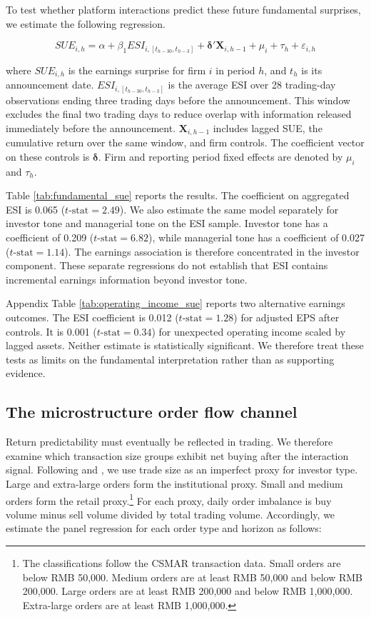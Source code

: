 \documentclass[12pt]{article}
\begin{document}
To test whether platform interactions predict these future fundamental surprises, we estimate the following regression.

\begin{equation}
    SUE_{i, h} = \alpha + \beta_1 ESI_{i,[t_{h-30}, t_{h-3}]} + \boldsymbol{\delta}'\mathbf{X}_{i,h-1} + \mu_i + \tau_h + \varepsilon_{i,h}
\end{equation}

\noindent where $SUE_{i,h}$ is the earnings surprise for firm $i$ in period $h$, and $t_h$ is its announcement date. $ESI_{i,[t_{h-30},t_{h-3}]}$ is the average ESI over 28 trading-day observations ending three trading days before the announcement. This window excludes the final two trading days to reduce overlap with information released immediately before the announcement. $\mathbf{X}_{i,h-1}$ includes lagged SUE, the cumulative return over the same window, and firm controls. The coefficient vector on these controls is $\boldsymbol{\delta}$. Firm and reporting period fixed effects are denoted by $\mu_i$ and $\tau_h$.

Table \ref{tab:fundamental_sue} reports the results. The coefficient on aggregated ESI is 0.065 ($t\text{-stat}=2.49$). We also estimate the same model separately for investor tone and managerial tone on the ESI sample. Investor tone has a coefficient of 0.209 ($t\text{-stat}=6.82$), while managerial tone has a coefficient of 0.027 ($t\text{-stat}=1.14$). The earnings association is therefore concentrated in the investor component. These separate regressions do not establish that ESI contains incremental earnings information beyond investor tone.

Appendix Table \ref{tab:operating_income_sue} reports two alternative earnings outcomes. The ESI coefficient is 0.012 ($t\text{-stat}=1.28$) for adjusted EPS after controls. It is 0.001 ($t\text{-stat}=0.34$) for unexpected operating income scaled by lagged assets. Neither estimate is statistically significant. We therefore treat these tests as limits on the fundamental interpretation rather than as supporting evidence.

\subsection{The microstructure order flow channel}
\label{sec:microstructure_oib}

Return predictability must eventually be reflected in trading. We therefore examine which transaction size groups exhibit net buying after the interaction signal. Following \citet{lee1992} and \citet{tong2013}, we use trade size as an imperfect proxy for investor type. Large and extra-large orders form the institutional proxy. Small and medium orders form the retail proxy.\footnote{The classifications follow the CSMAR transaction data. Small orders are below RMB 50,000. Medium orders are at least RMB 50,000 and below RMB 200,000. Large orders are at least RMB 200,000 and below RMB 1,000,000. Extra-large orders are at least RMB 1,000,000.} For each proxy, daily order imbalance is buy volume minus sell volume divided by total trading volume. Accordingly, we estimate the panel regression for each order type and horizon as follows:
\end{document}
